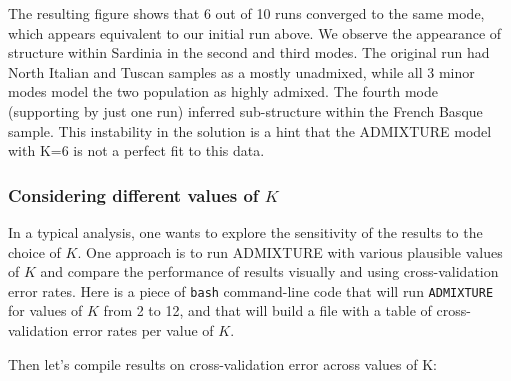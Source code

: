 \documentclass[smallextended]{svmult}       %
\newenvironment{Shaded}{\begin{snugshade}}{\end{snugshade}}
\newcommand{\KeywordTok}[1]{\textcolor[rgb]{0.13,0.29,0.53}{\textbf{#1}}}
\newcommand{\CommentTok}[1]{\textcolor[rgb]{0.56,0.35,0.01}{\textit{#1}}}
\newcommand{\FunctionTok}[1]{\textcolor[rgb]{0.00,0.00,0.00}{#1}}
\newcommand{\VariableTok}[1]{\textcolor[rgb]{0.00,0.00,0.00}{#1}}
\newcommand{\ExtensionTok}[1]{#1}
\newcommand{\NormalTok}[1]{#1}
\begin{document}
The resulting figure shows that 6 out of 10 runs converged to the same
mode, which appears equivalent to our initial run above. We observe the
appearance of structure within Sardinia in the second and third modes.
The original run had North Italian and Tuscan samples as a mostly
unadmixed, while all 3 minor modes model the two population as highly
admixed. The fourth mode (supporting by just one run) inferred
sub-structure within the French Basque sample. This instability in the
solution is a hint that the ADMIXTURE model with K=6 is not a perfect
fit to this data.

\subsubsection{\texorpdfstring{Considering different values of
\(K\)}{Considering different values of K}}\label{considering-different-values-of-k}

In a typical analysis, one wants to explore the sensitivity of the
results to the choice of \(K\). One approach is to run ADMIXTURE with
various plausible values of \(K\) and compare the performance of results
visually and using cross-validation error rates. Here is a piece of
\texttt{bash} command-line code that will run \texttt{ADMIXTURE} for
values of \(K\) from 2 to 12, and that will build a file with a table of
cross-validation error rates per value of \(K\).

\begin{Shaded}
\end{Shaded}

Then let's compile results on cross-validation error across values of K:
\end{document}
